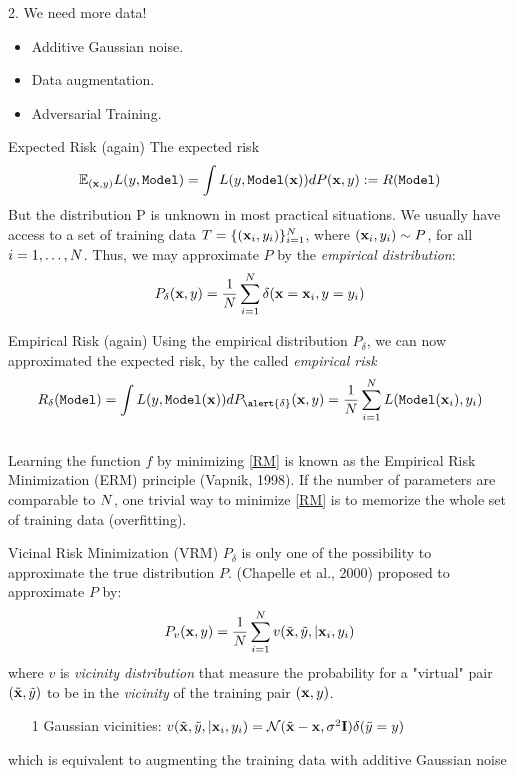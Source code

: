 \documentclass[xcolor=pdftex,dvipsnames,table,mathserif]{beamer}
\begin{document}
\begin{frame}{2. We need more data!}
\begin{itemize}
\item Additive Gaussian noise.
\item Data augmentation.
\item Adversarial Training.
\end{itemize}
\end{frame}

\begin{frame}{Expected Risk (again)}
The expected risk
\begin{equation*}
 \mathbb{E}_{(\mathbf{x},y)}  L(y,\texttt{Model}) =  \int L(y,\texttt{Model} (\mathbf{x})) dP(\mathbf{x},y) := R(\texttt{Model} )
\end{equation*}
\pause
But the distribution P is \alert{unknown} in most practical situations. 
\pause
We usually have access to a set of training data $T=\{(\mathbf{x}_i,y_i) \}_{i=1}^{N}$, where $(\mathbf{x}_i,y_i)\sim P$, for all $i=1,\ldots,N$. Thus, we may approximate $P$ by the \emph{empirical distribution}:
\begin{equation*}
P_{\delta}(\mathbf{x},y) = \frac{1}{N}\sum_{i=1}^{N}\delta(\mathbf{x}=\mathbf{x}_i,y=y_i)
\end{equation*}
\end{frame}

\begin{frame}{Empirical Risk (again)}
Using the empirical distribution $P_{\delta}$, we can now approximated the expected risk, by the called \emph{empirical risk}
\begin{equation}\label{RM}
R_{\delta}(\texttt{Model} ) = \int \loss(y,\texttt{Model} (\x)) dP_{\alert{\delta}}(\x,y) = \frac{1}{\nsize}\sum_{i=1}^{\nsize}\loss(\texttt{Model}(\x_i),y_i)
\end{equation} \\
Learning the function $f$ by minimizing \eqref{RM} is known as the Empirical Risk Minimization (ERM) principle \cite{vapnik98} (Vapnik, 1998). If the number of parameters are comparable to $N$, one trivial way to minimize \eqref{RM} is to \alert{memorize} the whole set of training data (overfitting).
\end{frame}

\begin{frame}{Vicinal Risk Minimization (VRM)}
$P_{\delta}$ is only one of the possibility to approximate the true distribution $P$. (Chapelle et al., 2000) proposed to approximate $P$ by:
\begin{equation*}
P_{v}(\mathbf{x},y) = \frac{1}{N}\sum_{i=1}^{N}v(\tilde{\mathbf{x}},\tilde{y}, |\mathbf{x}_i,y_i)
\end{equation*}
where $v$ is \emph{vicinity distribution} that measure the probability for a "virtual" pair $(\tilde{\mathbf{x}},\tilde{y})$ to be in the \emph{vicinity} of the training pair $(\mathbf{x},y)$. \pause
\begin{enumerate}
\item[1]  Gaussian vicinities: $v(\tilde{\mathbf{x}},\tilde{y}, |\mathbf{x}_i,y_i)=\mathcal{N}(\tilde{\mathbf{x}}-\mathbf{x},\sigma^2\mathbf{I})\delta(\tilde{y}=y)$
\end{enumerate}
\pause
\alert{which is equivalent to augmenting the training data with additive Gaussian noise}
\end{frame}
\end{document}
